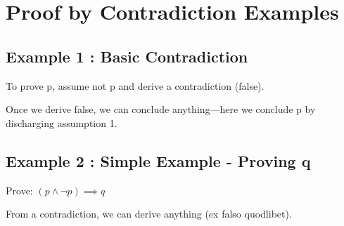\documentclass[a4paper,10pt,fleqn]{article}
\begin{document}
\section*{Proof by Contradiction Examples}

\subsection*{Example 1 : Basic Contradiction}

\noindent To prove p, assume not p and derive a contradiction (false).

\bigskip

\begin{center}
\end{center}
\bigskip

\noindent Once we derive false, we can conclude anything—here we conclude p by discharging assumption 1.

\bigskip

\subsection*{Example 2 : Simple Example - Proving q}

\noindent Prove: $(p \land \lnot p) \implies q$

\bigskip

\begin{center}
\end{center}
\bigskip

\noindent From a contradiction, we can derive anything (ex falso quodlibet).

\bigskip
\end{document}
